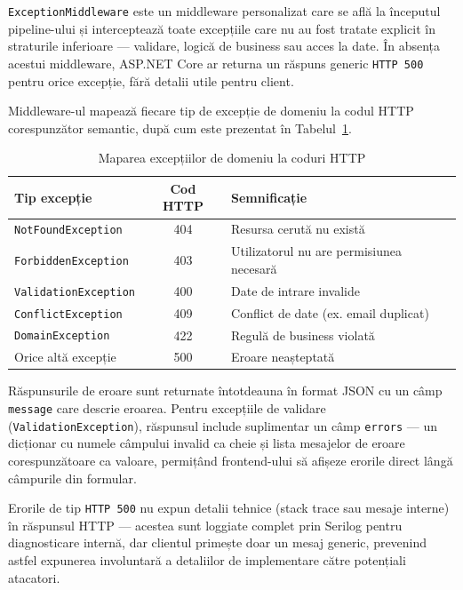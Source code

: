 \documentclass[12pt, a4paper]{report}
\begin{document}
\texttt{ExceptionMiddleware} este un middleware personalizat care se află la
începutul pipeline-ului și interceptează toate excepțiile care nu au fost tratate
explicit în straturile inferioare --- validare, logică de business sau acces la date.
În absența acestui middleware, ASP.NET Core ar returna un răspuns generic
\texttt{HTTP 500} pentru orice excepție, fără detalii utile pentru client.


Middleware-ul mapează fiecare tip de excepție de domeniu la codul HTTP
corespunzător semantic, după cum este prezentat în
Tabelul~\ref{tab:exceptions}.

\begin{table}[H]
\centering
\caption{Maparea excepțiilor de domeniu la coduri HTTP}
\label{tab:exceptions}
\begin{tabular}{|l|c|l|}
\hline
\textbf{Tip excepție} & \textbf{Cod HTTP} & \textbf{Semnificație} \\
\hline
\texttt{NotFoundException}   & 404 & Resursa cerută nu există \\
\texttt{ForbiddenException}  & 403 & Utilizatorul nu are permisiunea necesară \\
\texttt{ValidationException} & 400 & Date de intrare invalide \\
\texttt{ConflictException}   & 409 & Conflict de date (ex. email duplicat) \\
\texttt{DomainException}     & 422 & Regulă de business violată \\
Orice altă excepție          & 500 & Eroare neașteptată \\
\hline
\end{tabular}
\end{table}

Răspunsurile de eroare sunt returnate întotdeauna în format JSON cu un câmp
\texttt{message} care descrie eroarea. Pentru excepțiile de validare
(\texttt{ValidationException}), răspunsul include suplimentar un câmp
\texttt{errors} --- un dicționar cu numele câmpului invalid ca cheie și lista
mesajelor de eroare corespunzătoare ca valoare, permițând frontend-ului să
afișeze erorile direct lângă câmpurile din formular.

Erorile de tip \texttt{HTTP 500} nu expun detalii tehnice (stack trace sau
mesaje interne) în răspunsul HTTP --- acestea sunt loggiate complet prin
Serilog pentru diagnosticare internă, dar clientul primește doar un mesaj
generic, prevenind astfel expunerea involuntară a detaliilor de implementare
către potențiali atacatori.
\end{document}
